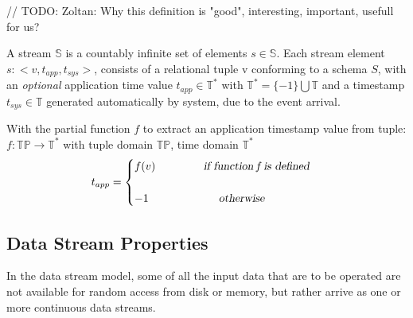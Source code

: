 // TODO: Zoltan: Why this definition is "good", interesting, important, usefull for us? 

\begin{defi}
	A stream $\mathbb{S}$ is a countably infinite set of elements $s \in \mathbb{S}$. Each  stream element $s: <v, t_{app}, t_{sys}>$, consists of a relational tuple v conforming to a schema $S$, with an \textit{optional} application time value $t_{app} \in \mathbb{T}^*$ with $\mathbb{T}^* = \{-1\} \bigcup \mathbb{T}$ and a timestamp $t_{sys} \in \mathbb{T}$ generated automatically by system, due to the event arrival.
\end{defi}

With the partial function $f$ to extract an application timestamp value from tuple: $f: \mathbb{TP} \rightarrow \mathbb{T}^*$ with tuple domain $\mathbb{TP}$, time domain $\mathbb{T}^*$
\begin{equation}
	t_{app} = 
	\begin{cases}
		f(v) \qquad\qquad \textsl{ if function}\, f\, \textsl{is  defined}\\
		   \\
		-1 \qquad\qquad\qquad \textsl{ otherwise}
	\end{cases}
\end{equation}



 
\subsection*{Data Stream Properties} 
In the data stream model, some of all the input data that are to be operated are not available for random access from disk or memory, but rather arrive as one or more continuous data streams. 


